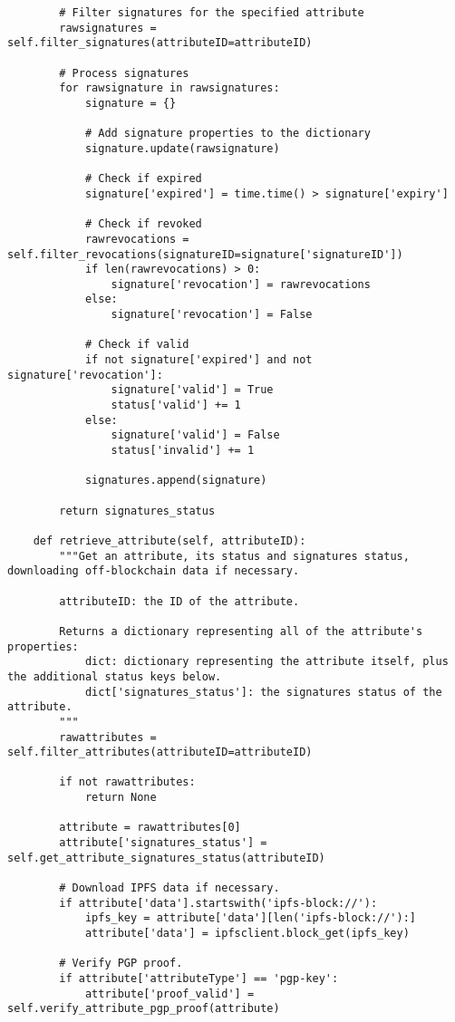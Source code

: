 \documentclass[12pt]{report}
\begin{document}
\begin{lstlisting}
        # Filter signatures for the specified attribute
        rawsignatures = self.filter_signatures(attributeID=attributeID)

        # Process signatures
        for rawsignature in rawsignatures:
            signature = {}

            # Add signature properties to the dictionary
            signature.update(rawsignature)

            # Check if expired
            signature['expired'] = time.time() > signature['expiry']

            # Check if revoked
            rawrevocations = self.filter_revocations(signatureID=signature['signatureID'])
            if len(rawrevocations) > 0:
                signature['revocation'] = rawrevocations
            else:
                signature['revocation'] = False

            # Check if valid
            if not signature['expired'] and not signature['revocation']:
                signature['valid'] = True
                status['valid'] += 1
            else:
                signature['valid'] = False
                status['invalid'] += 1

            signatures.append(signature)

        return signatures_status

    def retrieve_attribute(self, attributeID):
        """Get an attribute, its status and signatures status, downloading off-blockchain data if necessary.

        attributeID: the ID of the attribute.

        Returns a dictionary representing all of the attribute's properties:
            dict: dictionary representing the attribute itself, plus the additional status keys below.
            dict['signatures_status']: the signatures status of the attribute.
        """
        rawattributes = self.filter_attributes(attributeID=attributeID)

        if not rawattributes:
            return None

        attribute = rawattributes[0]
        attribute['signatures_status'] = self.get_attribute_signatures_status(attributeID)

        # Download IPFS data if necessary.
        if attribute['data'].startswith('ipfs-block://'):
            ipfs_key = attribute['data'][len('ipfs-block://'):]
            attribute['data'] = ipfsclient.block_get(ipfs_key)

        # Verify PGP proof.
        if attribute['attributeType'] == 'pgp-key':
            attribute['proof_valid'] = self.verify_attribute_pgp_proof(attribute)


\end{lstlisting}
\end{document}
